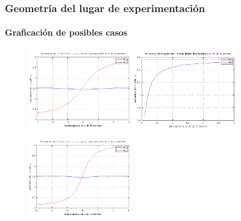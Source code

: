 \documentclass[10pt, compress]{beamer}
\begin{document}
\begin{frame}[fragile]
	\frametitle{Geometría del lugar de experimentación}
	\framesubtitle{Graficación de posibles casos}
	\begin{figure}[htbp]
	 	\includegraphics[width=0.4\textwidth]{./pictures/figure3}
	 	\includegraphics[width=0.4\textwidth]{./pictures/figure4}
	\end{figure}

	\begin{figure}[htbp]
	 	\includegraphics[width=0.4\textwidth]{./pictures/figure5}
	\end{figure}
\end{frame}	
\end{document}
